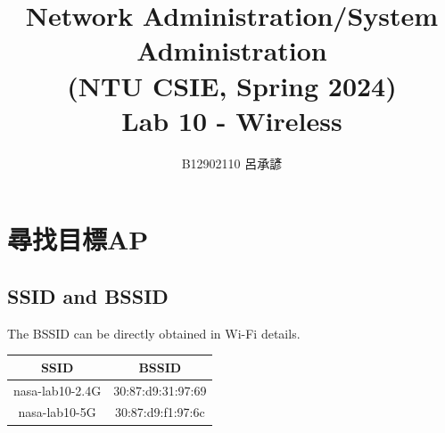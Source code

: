 \documentclass[12pt, a4paper]{article}
\title{
  \vspace{-1cm}
  Network Administration/System Administration\\
  (NTU CSIE, Spring 2024)\\
  Lab 10 - Wireless
}
\author{\Large B12902110 呂承諺}
\begin{document}
  \maketitle
  \section{尋找目標AP}
  \subsection{SSID and BSSID}
  The BSSID can be directly obtained in Wi-Fi details.
  \begin{table}[H]
    \begin{tabular}{|cc|}
      \hline
      \textbf{SSID}   & \textbf{BSSID}    \\\hline
      nasa-lab10-2.4G & 30:87:d9:31:97:69 \\
      nasa-lab10-5G   & 30:87:d9:f1:97:6c \\\hline
    \end{tabular}
  \end{table}
\end{document}
